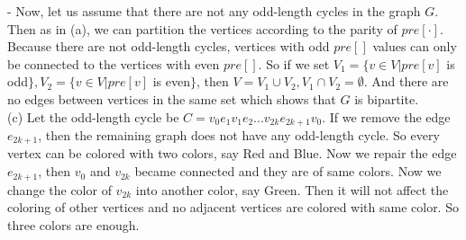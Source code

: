 \documentclass{article}
\begin{document}
- Now, let us assume that there are not any odd-length cycles in the graph $G$. Then as in (a), we can partition the vertices according to the parity of $pre[\cdot]$. Because there are not odd-length cycles, vertices with odd $pre[]$ values can only be connected to the vertices with even $pre[]$. So if we set $V_1=\{v\in V|pre[v]$ is odd$\}, V_2=\{v\in V|pre[v]$ is even$\}$, then $V=V_1\cup V_2, V_1\cap V_2=\emptyset$. And there are no edges between vertices in the same set which shows that $G$ is bipartite.\\
(c) Let the odd-length cycle be $C = v_0e_1v_1e_2...v_{2k}e_{2k+1}v_0$. If we remove the edge $e_{2k+1}$, then the remaining graph does not have any odd-length cycle. So every vertex can be colored with two colors, say Red and Blue. Now we repair the edge $e_{2k+1}$, then $v_0$ and $v_{2k}$ became connected and they are of same colors. Now we change the color of $v_{2k}$ into another color, say Green. Then it will not affect the coloring of other vertices and no adjacent vertices are colored with same color. So three colors are enough. \\
\pagebreak
\end{document}
